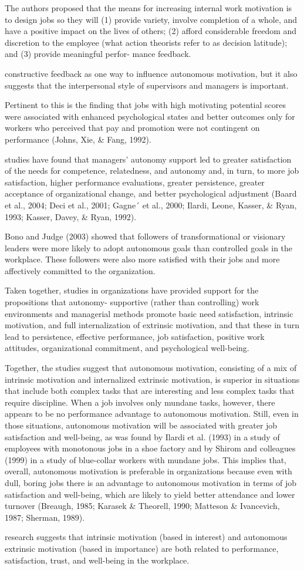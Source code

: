 The authors proposed that the means for increasing internal work motivation is to design jobs so they will (1) provide variety, involve completion of a whole, and have a positive impact on the lives of others; (2) afford considerable freedom and discretion to the employee (what action theorists refer to as decision latitude); and (3) provide meaningful perfor-
mance feedback.

constructive feedback as one way to inﬂuence autonomous motivation, but it also suggests that the interpersonal style of supervisors and managers is important.

Pertinent to this is the ﬁnding that jobs with high motivating potential scores were associated with enhanced psychological states and better outcomes only for workers who perceived that pay and promotion were not contingent on performance (Johns, Xie, & Fang, 1992).

studies have found that managers’ autonomy support led to greater satisfaction of the needs for competence, relatedness, and autonomy and, in turn, to more job satisfaction, higher performance evaluations, greater persistence, greater acceptance of organizational change, and better psychological adjustment (Baard et al., 2004; Deci et al., 2001; Gagne´ et al., 2000; Ilardi, Leone, Kasser, & Ryan, 1993; Kasser, Davey, & Ryan, 1992).

Bono and Judge (2003) showed that followers of transformational or visionary leaders were more likely to adopt autonomous goals than controlled goals in the workplace. These followers were also more satisﬁed with their jobs and more affectively committed to the organization.

Taken together, studies in organizations have provided support for the propositions that autonomy-
supportive (rather than controlling) work environments and managerial methods promote basic need satisfaction, intrinsic motivation, and full internalization of extrinsic motivation, and that these in turn lead to persistence, effective performance, job satisfaction, positive work attitudes, organizational commitment, and psychological well-being.


Together, the studies suggest that autonomous motivation, consisting of a mix of intrinsic motivation and internalized extrinsic motivation, is superior in situations that include both complex tasks that are interesting and less complex tasks that require discipline. When a job involves only mundane tasks, however, there appears to be no performance advantage to autonomous motivation. Still, even in those situations, autonomous motivation will be associated with greater job satisfaction and well-being, as was found by Ilardi et al. (1993) in a study of employees with monotonous jobs in a shoe factory and by Shirom and colleagues (1999) in a study of blue-collar workers with mundane jobs. This implies that, overall, autonomous motivation is preferable in organizations because even with dull, boring jobs there is an advantage to autonomous motivation in terms of job satisfaction and well-being, which are likely to yield better attendance and lower turnover (Breaugh, 1985; Karasek & Theorell, 1990; Matteson & Ivancevich, 1987; Sherman, 1989).

research suggests that intrinsic motivation (based in interest) and autonomous extrinsic motivation (based in importance) are both related to performance, satisfaction, trust, and well-being in the workplace.